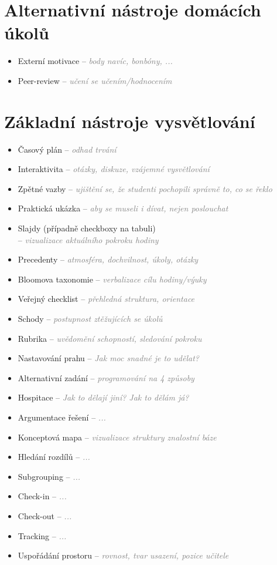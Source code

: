 \documentclass[twoside,openany]{book}
\newcommand{\note}[1]{\textcolor{gray}{\small\itshape #1}}
\begin{document}
\section*{Alternativní nástroje domácích úkolů}
\begin{itemize}
\item Externí motivace -- \note{body navíc, bonbóny, ...}
\item Peer-review -- \note{učení se učením/hodnocením}
\end{itemize}

\section*{Základní nástroje vysvětlování}
\begin{itemize}
\item Časový plán -- \note{odhad trvání}
\item Interaktivita -- \note{otázky, diskuze, vzájemné vysvětlování}
\item Zpětné vazby -- \note{ujištění se, že studenti pochopili správně to, co se řeklo}
\item Praktická ukázka -- \note{aby se museli i dívat, nejen poslouchat}
\item Slajdy (případně checkboxy na tabuli)\\ -- \note{vizualizace aktuálního pokroku hodiny}
\item Precedenty -- \note{atmosféra, dochvilnost, úkoly, otázky}
\item Bloomova taxonomie -- \note{verbalizace cílu hodiny/výuky}
\item Veřejný checklist -- \note{přehledná struktura, orientace}
\item Schody -- \note{postupnost ztěžujících se úkolů}
\item Rubrika -- \note{uvědomění schopností, sledování pokroku}
\item Nastavování prahu -- \note{Jak moc snadné je to udělat?}
\item Alternativní zadání -- \note{programování na 4 způsoby}
\item Hospitace -- \note{Jak to dělají jiní? Jak to dělám já?}
\item Argumentace řešení -- \note{...}
\item Konceptová mapa -- \note{vizualizace struktury znalostní báze}
\item Hledání rozdílů -- \note{...}
\item Subgrouping -- \note{...}
\item Check-in -- \note{...}
\item Check-out -- \note{...}
\item Tracking -- \note{...}
\item Uspořádání prostoru -- \note{rovnost, tvar usazení, pozice učitele}
\end{itemize}
\end{document}
